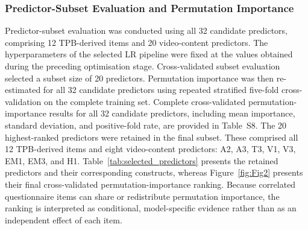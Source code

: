\documentclass[jtaer,article,submit,moreauthors]{Definitions/mdpi}
\begin{document}
\subsubsection{Predictor-Subset Evaluation and Permutation Importance}

Predictor-subset evaluation was conducted using all 32 candidate
predictors, comprising 12 TPB-derived items and 20 video-content
predictors. The hyperparameters of the selected LR pipeline were fixed
at the values obtained during the preceding optimisation stage.
Cross-validated subset evaluation selected a subset size of 20
predictors.
Permutation importance was then re-estimated for all 32 candidate
predictors using repeated stratified five-fold cross-validation on the
complete training set. Complete cross-validated permutation-importance
results for all 32 candidate predictors, including mean importance,
standard deviation, and positive-fold rate, are provided in Table~S8.
The 20 highest-ranked predictors were retained in the final subset.
These comprised all 12 TPB-derived items and eight video-content
predictors: A2, A3, T3, V1, V3, EM1, EM3, and H1.
Table~\ref{tab:selected_predictors} presents the retained predictors
and their corresponding constructs, whereas
Figure~\ref{fig:Fig2} presents their final cross-validated
permutation-importance ranking. Because correlated questionnaire items
can share or redistribute permutation importance, the ranking is
interpreted as conditional, model-specific evidence rather than as an
independent effect of each item.

\renewcommand{\arraystretch}{1.15}
\end{document}
